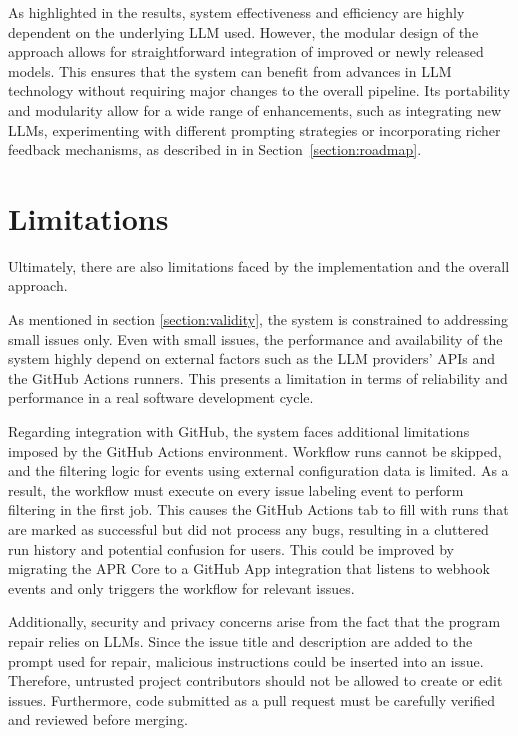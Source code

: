 As highlighted in the results, system effectiveness and efficiency are highly dependent on the underlying \ac{LLM} used. However, the modular design of the approach allows for straightforward integration of improved or newly released models. This ensures that the system can benefit from advances in \ac{LLM} technology without requiring major changes to the overall pipeline. Its portability and modularity allow for a wide range of enhancements, such as integrating new \acp{LLM}, experimenting with different prompting strategies or incorporating richer feedback mechanisms, as described in in Section~\ref{section:roadmap}.

\section{Limitations}
Ultimately, there are also limitations faced by the implementation and the overall approach.

As mentioned in section \ref{section:validity}, the system is constrained to addressing small issues only. Even with small issues, the performance and availability of the system highly depend on external factors such as the \ac{LLM} providers' APIs and the GitHub Actions runners. This presents a limitation in terms of reliability and performance in a real software development cycle.

Regarding integration with GitHub, the system faces additional limitations imposed by the GitHub Actions environment. Workflow runs cannot be skipped, and the filtering logic for events using external configuration data is limited. As a result, the workflow must execute on every issue labeling event to perform filtering in the first job. This causes the GitHub Actions tab to fill with runs that are marked as successful but did not process any bugs, resulting in a cluttered run history and potential confusion for users. This could be improved by migrating the APR Core to a GitHub App integration that listens to webhook events and only triggers the workflow for relevant issues.

Additionally, security and privacy concerns arise from the fact that the program repair relies on \acp{LLM}. Since the issue title and description are added to the prompt used for repair, malicious instructions could be inserted into an issue. Therefore, untrusted project contributors should not be allowed to create or edit issues. Furthermore, code submitted as a pull request must be carefully verified and reviewed before merging.

